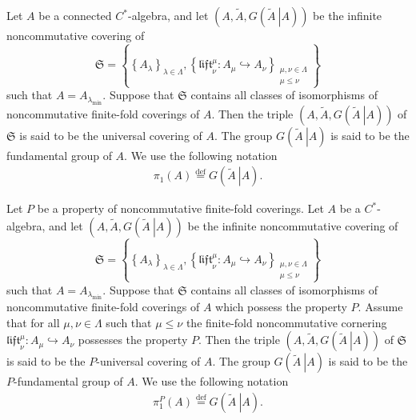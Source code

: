 \documentclass{beamer}
\theoremstyle{plain}
\newcommand{\lift}{\mathfrak{lift}}
\newcommand{\la}{\lambda}
\newcommand{\La}{\Lambda}
\newcommand{\bean}{\begin{eqnarray*}}
\newcommand{\eean}{\end{eqnarray*}}
\newcommand{\hookto}{\hookrightarrow}        %
\begin{document}
\begin{frame}
\begin{definition}
	Let $A$ be a connected $C^*$-algebra, and let 
	$
	\left(A, \widetilde{A}, G\left(\left.\widetilde{A}~\right| A\right)\right)
	$
	be the  {infinite noncommutative covering}  of $$\mathfrak{S}=\left\{\left\{A_\la\right\}_{\la\in \La}, \left\{\lift^\mu_\nu : A_\mu \hookto A_\nu\right\}_{\substack{\mu, \nu \in \La\\\mu \le \nu}}\right\}$$ such that $A = A_{\la_{\mathrm{min}}}$.
	Suppose that $\mathfrak{S}$ contains \alert{all} classes of isomorphisms of  noncommutative finite-fold coverings of $A$. Then the triple $\left(A, \widetilde{A}, G\left(\left.\widetilde{A}~\right|{A}  \right) \right)$ of $\mathfrak{S}$ is said to be the \alert{universal  covering} 
	of $A$.  The group $G\left(\left.\widetilde{A}~\right|{A}  \right)$  is said to be the \alert{fundamental group} of $A$. We use the following notation
	\bean
	\pi_1\left(A \right) \stackrel{\mathrm{def}}{=} G\left(\left.\widetilde{A}~\right|{A} \right).
	\eean
\end{definition}
\end{frame}
\begin{frame}

\begin{definition} 
	Let $P$ be a property of noncommutative finite-fold coverings.	Let $A$ be a $C^*$-algebra, and let 	$	\left(A, \widetilde{A}, G\left(\left.\widetilde{A}~\right| A\right)\right)	$	be the  {infinite noncommutative covering}  of $$\mathfrak{S}=\left\{\left\{A_\la\right\}_{\la\in \La}, \left\{\lift^\mu_\nu : A_\mu \hookto A_\nu\right\}_{\substack{\mu, \nu \in \La\\\mu \le \nu}}\right\}$$ such that $A = A_{\la_{\mathrm{min}}}$.	Suppose that $\mathfrak{S}$ contains \alert{all} classes of isomorphisms of noncommutative finite-fold coverings of $A$  which possess the property $P$. Assume that for all $\mu, \nu \in \La$ such that $\mu \le \nu$ the finite-fold noncommutative cornering  $\lift^\mu_\nu : A_\mu \hookto A_\nu$ possesses the property $P$. 	Then the triple $\left(A, \widetilde{A}, G\left(\left.\widetilde{A}~\right|{A}  \right) \right)$ of $\mathfrak{S}$ is said to be the $P$-\alert{universal  covering} 	of $A$.  The group $G\left(\left.\widetilde{A}~\right|{A}  \right)$  is said to be the $P$-\alert{fundamental group} of $A$. We use the following notation
	\bean
	\pi^P_1\left(A \right) \stackrel{\mathrm{def}}{=} G\left(\left.\widetilde{A}~\right|{A} \right).
	\eean
\end{definition}
\end{frame}
\end{document}
